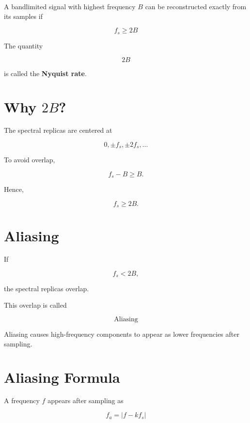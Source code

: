 \begin{tcolorbox}[colback=green!5!white,colframe=green!60!black,title=Nyquist Theorem]

A bandlimited signal with highest frequency \(B\) can be reconstructed exactly
from its samples if

\[
\boxed{
f_s\ge 2B
}
\]

\end{tcolorbox}

The quantity

\[
\boxed{
2B
}
\]

is called the \textbf{Nyquist rate}.


\section{Why \(2B\)?}

The spectral replicas are centered at

\[
0,\pm f_s,\pm2f_s,\ldots
\]

To avoid overlap,

\[
f_s-B\ge B.
\]

Hence,

\[
f_s\ge2B.
\]


\section{Aliasing}

If

\[
f_s<2B,
\]

the spectral replicas overlap.

This overlap is called

\[
\boxed{
\text{Aliasing}
}
\]

Aliasing causes high-frequency components to appear as lower frequencies after
sampling.


\section{Aliasing Formula}

A frequency \(f\) appears after sampling as

\[
\boxed{
f_a=
|f-kf_s|
}
\]

